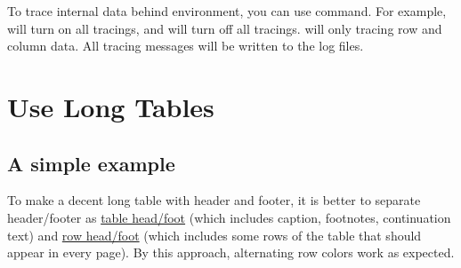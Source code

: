 \documentclass[oneside]{book}
\begin{document}
To trace internal data behind  environment, you can use \CC{\SetTblrTracing} command.
For example,  will turn on all tracings,
and  will turn off all tracings.
 will only tracing row and column data.
All tracing messages will be written to the log files.

\chapter{Use Long Tables}
\label{chap:long}

\section{A simple example}

To make a decent long table with header and footer, it is better to separate header/footer as
\underline{table head/foot} (which includes caption, footnotes, continuation text)
and \underline{row head/foot} (which includes some rows of the table that should appear in every page).
By this approach, alternating row colors work as expected.
\end{document}

